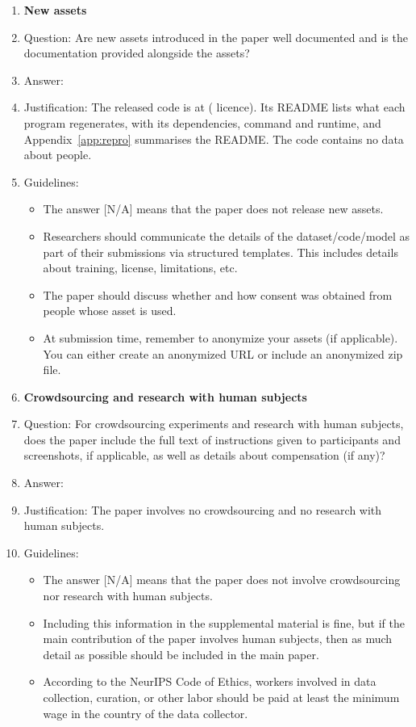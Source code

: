 \begin{enumerate}
\item {\bf New assets}
    \item[] Question: Are new assets introduced in the paper well documented and is the documentation provided alongside the assets?
    \item[] Answer: \answerYes{}
    \item[] Justification: The released code is at \coderepo{} (\codelicence{} licence). Its README lists what each program regenerates, with its dependencies, command and runtime, and Appendix~\ref{app:repro} summarises the README. The code contains no data about people.
    \item[] Guidelines:
    \begin{itemize}
        \item The answer [N/A] means that the paper does not release new assets.
        \item Researchers should communicate the details of the dataset/code/model as part of their submissions via structured templates. This includes details about training, license, limitations, etc.
        \item The paper should discuss whether and how consent was obtained from people whose asset is used.
        \item At submission time, remember to anonymize your assets (if applicable). You can either create an anonymized URL or include an anonymized zip file.
    \end{itemize}

\item {\bf Crowdsourcing and research with human subjects}
    \item[] Question: For crowdsourcing experiments and research with human subjects, does the paper include the full text of instructions given to participants and screenshots, if applicable, as well as details about compensation (if any)?
    \item[] Answer: \answerNA{}
    \item[] Justification: The paper involves no crowdsourcing and no research with human subjects.
    \item[] Guidelines:
    \begin{itemize}
        \item The answer [N/A] means that the paper does not involve crowdsourcing nor research with human subjects.
        \item Including this information in the supplemental material is fine, but if the main contribution of the paper involves human subjects, then as much detail as possible should be included in the main paper.
        \item According to the NeurIPS Code of Ethics, workers involved in data collection, curation, or other labor should be paid at least the minimum wage in the country of the data collector.
    \end{itemize}


\end{enumerate}
